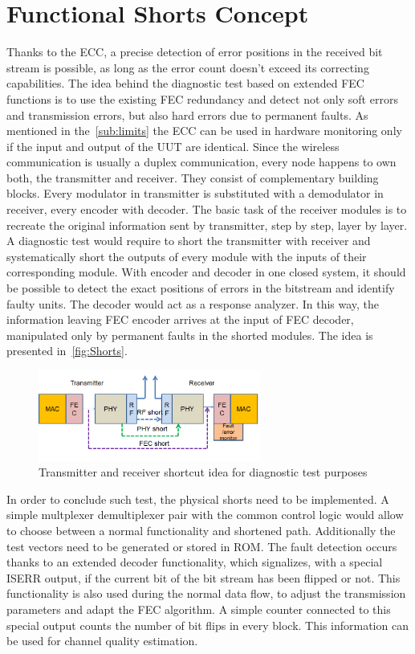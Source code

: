 \section{Functional Shorts Concept}
Thanks to the ECC, a precise detection of error positions in the received bit stream is possible, as long as the error count doesn't exceed its correcting capabilities. The idea behind the diagnostic test based on extended FEC functions is to use the existing FEC redundancy and detect not only soft errors and transmission errors, but also hard errors due to permanent faults. As mentioned in the~\autoref{sub:limits} the ECC can be used in hardware monitoring only if the input and output of the UUT are identical. Since the wireless communication is usually a duplex communication, every node happens to own both, the transmitter and receiver. They consist of complementary building blocks. Every modulator in transmitter is substituted with a demodulator in receiver, every encoder with decoder. The basic task of the receiver modules is to recreate the original information sent by transmitter, step by step, layer by layer. A diagnostic test would require to short the transmitter with receiver and systematically short the outputs of every module with the inputs of their corresponding module. With encoder and decoder in one closed system, it should be possible to detect the exact positions of errors in the bitstream and identify faulty units. The decoder would act as a response analyzer. In this way, the information leaving FEC encoder arrives at the input of FEC decoder, manipulated only by permanent faults in the shorted modules. The idea is presented in~\autoref{fig:Shorts}. 

\begin{figure}[h]
\centering
\includegraphics[width=0.65\textwidth]{figures/Shorts.png}
\caption{Transmitter and receiver shortcut idea for diagnostic test purposes}
\label{fig:Shorts}
\end{figure}

In order to conclude such test, the physical shorts need to be implemented. A simple multplexer demultiplexer pair with the common control logic would allow to choose between a normal functionality and shortened path. Additionally the test vectors need to be generated or stored in ROM. The fault detection occurs thanks to an extended decoder functionality, which signalizes, with a special ISERR output, if the current bit of the bit stream has been flipped or not. This functionality is also used during the normal data flow, to adjust the transmission parameters and adapt the FEC algorithm. A simple counter connected to this special output counts the number of bit flips in every block. This information can be used for channel quality estimation. 

